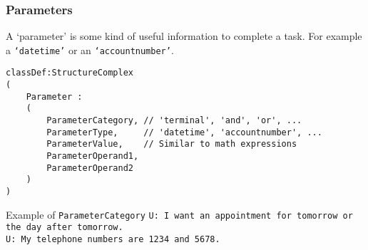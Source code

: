 \documentclass[11pt]{beamer}
\begin{document}
\begin{frame}[fragile]
\frametitle{Parameters}
A `parameter' is some kind of useful information to complete a task. For example a \texttt{`datetime'} or an \texttt{`accountnumber'}.
\scriptsize
\begin{lstlisting}[language=lekta]
classDef:StructureComplex
(
	Parameter :
	(
		ParameterCategory, // 'terminal', 'and', 'or', ...
		ParameterType,     // 'datetime', 'accountnumber', ...
		ParameterValue,    // Similar to math expressions
		ParameterOperand1, 
		ParameterOperand2
	)
)
\end{lstlisting}
\pause
	\begin{block}{Example of \texttt{ParameterCategory}}
		{\color{teal} 
			\texttt{U: I want an appointment for tomorrow or the day after tomorrow.}\\
			\vspace{10pt}
			\texttt{U: My telephone numbers are 1234 and 5678.}\\
		}
	\end{block}
\end{frame}
\end{document}
